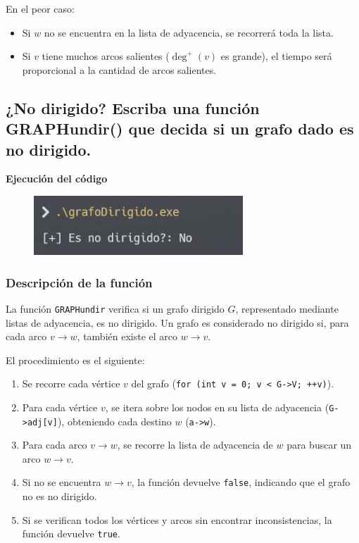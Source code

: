 \documentclass{article}
\begin{document}
            En el peor caso:
            \begin{itemize}
                \item Si \( w \) no se encuentra en la lista de adyacencia, se recorrerá toda la lista.
                \item Si \( v \) tiene muchos arcos salientes (\( \deg^+(v) \) es grande), el tiempo será proporcional a la cantidad de arcos salientes.
            \end{itemize}
            

    \subsection{¿No dirigido? Escriba una función GRAPHundir() que decida si un grafo dado es no dirigido.}

        

        \textbf{Ejecución del código}
            \begin{figure}[H]
            	\centering
             	\includegraphics[width=0.7\textwidth,keepaspectratio]{img/exercise6.png}
            \end{figure}

        \subsubsection*{Descripción de la función}
            La función \texttt{GRAPHundir} verifica si un grafo dirigido \( G \), representado mediante listas de adyacencia, es no dirigido. Un grafo es considerado no dirigido si, para cada arco \( v \to w \), también existe el arco \( w \to v \).
            
            El procedimiento es el siguiente:
            \begin{enumerate}
                \item Se recorre cada vértice \( v \) del grafo (\texttt{for (int v = 0; v < G->V; ++v)}).
                \item Para cada vértice \( v \), se itera sobre los nodos en su lista de adyacencia (\texttt{G->adj[v]}), obteniendo cada destino \( w \) (\texttt{a->w}).
                \item Para cada arco \( v \to w \), se recorre la lista de adyacencia de \( w \) para buscar un arco \( w \to v \).
                \item Si no se encuentra \( w \to v \), la función devuelve \texttt{false}, indicando que el grafo no es no dirigido.
                \item Si se verifican todos los vértices y arcos sin encontrar inconsistencias, la función devuelve \texttt{true}.
            \end{enumerate}
            
\end{document}
